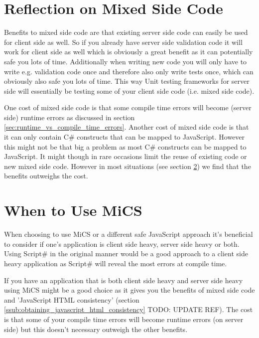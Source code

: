 
\section{Reflection on Mixed Side Code} %
\label{sec:reflection_on_mixed_side_code}
	Benefits to mixed side code are that existing server side code can easily be used for client side as well. So if you already have server side validation code it will work for client side as well which is obviously a great benefit as it can potentially safe you lots of time. Additionally when writing new code you will only have to write e.g. validation code once and therefore also only write tests once, which can obviously also safe you lots of time. This way Unit testing frameworks for server side will essentially be testing some of your client side code (i.e. mixed side code).

	One cost of mixed side code is that some compile time errors will become (server side) runtime errors as discussed in section \ref{sec:runtime_vs_compile_time_errors}. Another cost of mixed side code is that it can only contain C\# constructs that can be mapped to JavaScript. However this might not be that big a problem as most C\# constructs can be mapped to JavaScript. It might though in rare occasions limit the reuse of existing code or new mixed side code. However in most situations (see section \ref{sec:when_to_use_mics}) we find that the benefits outweighs the cost.


\section{When to Use MiCS} %
\label{sec:when_to_use_mics}
	When choosing to use MiCS or a different safe JavaScript approach it’s beneficial to consider if one’s application is client side heavy, server side heavy or both. Using Script\# in the original manner would be a good approach to a client side heavy application as Script\# will reveal the most errors at compile time. 

	If you have an application that is both client side heavy and server side heavy using MiCS might be a good choice as it gives you the benefits of mixed side code and 'JavaScript HTML consistency' (section \ref{ssub:obtaining_javascript_html_consistency} TODO: UPDATE REF). The cost is that some of your compile time errors will become runtime errors (on server side) but this doesn’t necessary outweigh the other benefits. 

